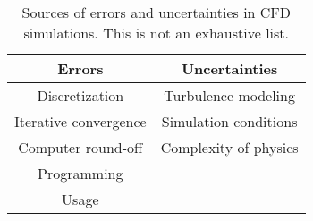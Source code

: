 \begin{table}
    \centering
    \def\arraystretch{1.2}
    \begin{tabular}{c|c}
         \textbf{Errors} &  \textbf{Uncertainties} \\ \hline
         Discretization & Turbulence modeling \\
         Iterative convergence & Simulation conditions \\
         Computer round-off & Complexity of physics \\
         Programming & \\
         Usage & \\
    \end{tabular}
    \caption{Sources of errors and uncertainties in CFD simulations. This is not an exhaustive list.}
    \label{tab:errors_uncert}
\end{table}